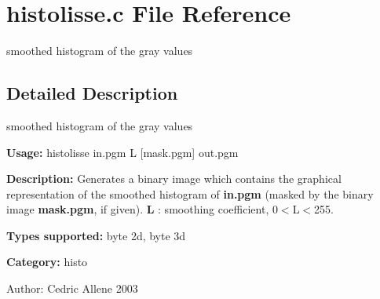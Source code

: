 \section{histolisse.c File Reference}
\label{histolisse_8c}
smoothed histogram of the gray values 



\subsection{Detailed Description}
smoothed histogram of the gray values 

{\bf Usage:} histolisse in.pgm L [mask.pgm] out.pgm

{\bf Description:} Generates a binary image which contains the graphical representation of the smoothed histogram of {\bf in.pgm} (masked by the binary image {\bf mask.pgm}, if given). {\bf L} : smoothing coefficient, 0$<$L$<$255.

{\bf Types supported:} byte 2d, byte 3d

{\bf Category:} histo

\begin{Desc}
\item[Author:]Cedric Allene 2003 \end{Desc}
